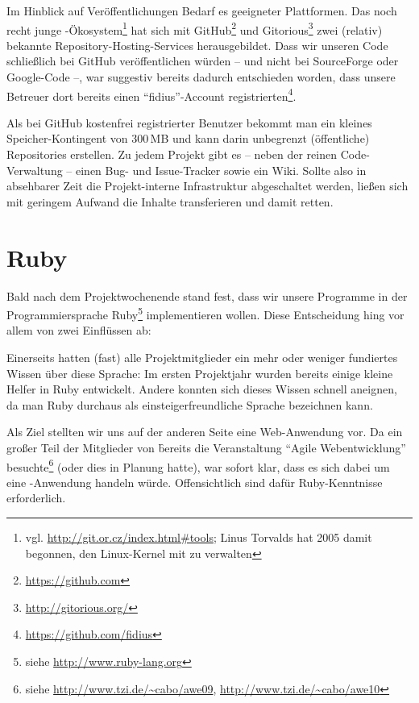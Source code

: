 Im Hinblick auf Veröffentlichungen Bedarf es geeigneter Plattformen. Das noch
recht junge -Ökosystem\footnote{vgl. \url{http://git.or.cz/index.html\#tools};
Linus Torvalds hat 2005 damit begonnen, den Linux-Kernel mit  zu verwalten}
hat sich mit GitHub\footnote{\url{https://github.com}} und
Gitorious\footnote{\url{http://gitorious.org/}} zwei (relativ) bekannte
Repository-Hosting-Services herausgebildet. Dass wir unseren Code schließlich
bei GitHub veröffentlichen würden -- und nicht \zB bei SourceForge oder Google-Code --,
war suggestiv bereits dadurch entschieden worden, dass unsere Betreuer dort bereits
einen \enquote{fidius}-Account registrierten\footnote{\url{https://github.com/fidius}}.

Als bei GitHub kostenfrei registrierter Benutzer bekommt man ein kleines
Speicher-Kontingent von 300\,MB und kann darin unbegrenzt (öffentliche)
Repositories erstellen. Zu jedem Projekt gibt es -- neben der reinen
Code-Verwaltung -- einen Bug- und Issue-Tracker sowie ein
Wiki. Sollte also in absehbarer Zeit die Projekt-interne Infrastruktur
abgeschaltet werden, ließen sich mit geringem Aufwand die Inhalte
transferieren und damit retten.


\section{Ruby}
\authors{\DM}{\DE \and \LM \and \MW \and \JF}

Bald nach dem Projektwochenende stand fest, dass wir unsere Programme in der
Programmiersprache Ruby\footnote{siehe \url{http://www.ruby-lang.org}}
implementieren wollen. Diese Entscheidung hing vor allem von zwei Einflüssen
ab:

Einerseits hatten (fast) alle Projektmitglieder ein mehr oder weniger fundiertes
Wissen über diese Sprache: Im ersten Projektjahr wurden bereits einige kleine
Helfer in Ruby entwickelt. Andere konnten sich dieses Wissen schnell aneignen,
da man Ruby durchaus als einsteigerfreundliche Sprache bezeichnen kann.

Als Ziel stellten wir uns auf der anderen Seite eine Web-Anwendung vor. Da ein
großer Teil der Mitglieder von \f bereits die Veranstaltung \enquote{Agile
Webentwicklung} besuchte\footnote{siehe \uA \url{http://www.tzi.de/~cabo/awe09},
\url{http://www.tzi.de/~cabo/awe10}} (oder dies in Planung hatte), war sofort klar, dass es sich
dabei um eine -Anwendung handeln würde. Offensichtlich sind dafür
Ruby-Kenntnisse erforderlich.

